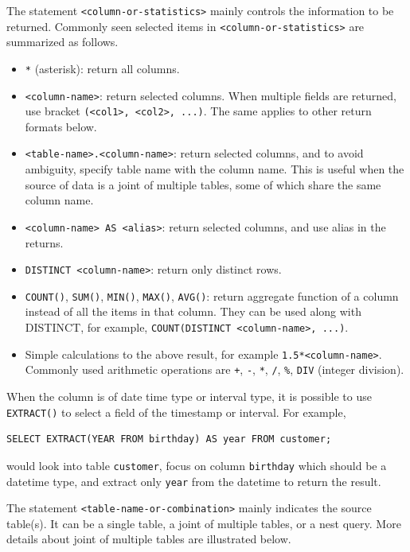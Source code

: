 The statement \verb|<column-or-statistics>| mainly controls the information to be returned. Commonly seen selected items in \verb|<column-or-statistics>| are summarized as follows.
\begin{itemize}
  \item \verb|*| (asterisk): return all columns.
  \item \verb|<column-name>|: return selected columns.  When multiple fields are returned, use bracket \verb|(<col1>, <col2>, ...)|. The same applies to other return formats below.
  \item \verb|<table-name>.<column-name>|: return selected columns, and to avoid ambiguity, specify table name with the column name. This is useful when the source of data is a joint of multiple tables, some of which share the same column name.
  \item \verb|<column-name> AS <alias>|: return selected columns, and use alias in the returns.
  \item \verb|DISTINCT <column-name>|: return only distinct rows.
  \item \verb|COUNT()|, \verb|SUM()|, \verb|MIN()|, \verb|MAX()|, \verb|AVG()|: return aggregate function of a column instead of all the items in that column. They can be used along with DISTINCT, for example, \verb|COUNT(DISTINCT <column-name>, ...)|.
  \item Simple calculations to the above result, for example \verb|1.5*<column-name>|. Commonly used arithmetic operations are \verb|+|, \verb|-|, \verb|*|, \verb|/|, \verb|%|, \verb|DIV| (integer division).
\end{itemize}
When the column is of date time type or interval type, it is possible to use \verb|EXTRACT()| to select a field of the timestamp or interval. For example,
\begin{lstlisting}
SELECT EXTRACT(YEAR FROM birthday) AS year FROM customer;
\end{lstlisting}
would look into table \verb|customer|, focus on column \verb|birthday| which should be a datetime type, and extract only \verb|year| from the datetime to return the result.

The statement \verb|<table-name-or-combination>| mainly indicates the source table(s). It can be a single table, a joint of multiple tables, or a nest query. More details about joint of multiple tables are illustrated below.

